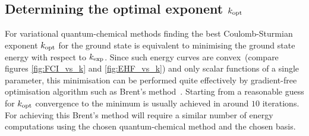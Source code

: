 %


%
%


%
%
\subsection{Determining the optimal exponent $k_\text{opt}$}
\label{sec:DetermineKopt}
For variational quantum-chemical methods finding the best Coulomb-Sturmian
exponent $k_\text{opt}$ for the ground state is equivalent to minimising the ground state
energy with respect to $k_\text{exp}$.
Since such energy curves are
convex~(compare figures \ref{fig:FCI_vs_k} and \ref{fig:EHF_vs_k})
and only scalar functions of a single parameter,
this minimisation can be performed quite effectively
by gradient-free optimisation algorithm such as Brent's method~\cite{Brent1972}.
Starting from a reasonable guess for $k_\text{opt}$ convergence to the minimum
is usually achieved in around $10$ iterations.
For achieving this Brent's method will require a similar number of
energy computations using the chosen quantum-chemical method
and the chosen \CS basis.

